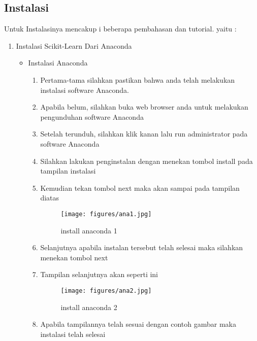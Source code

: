 \subsection{Instalasi}
Untuk Instalasinya mencakup i beberapa pembahasan dan tutorial. yaitu :
\begin{enumerate}
\item Instalasi Scikit-Learn Dari Anaconda
\begin{itemize}
\item Instalasi Anaconda
\begin{enumerate}
\item Pertama-tama silahkan pastikan bahwa anda telah melakukan instalasi software Anaconda.
\item Apabila belum, silahkan buka web browser anda untuk melakukan pengunduhan software Anaconda
\item Setelah terunduh, silahkan klik kanan lalu run administrator pada software Anaconda
\item Silahkan lakukan penginstalan dengan menekan tombol install pada tampilan instalasi
\item Kemudian tekan tombol next maka akan sampai pada tampilan diatas

\par

\begin{figure}[ht]
\centering
\texttt{[image: figures/ana1.jpg]}
\caption{install anaconda 1}
\label{contoh}
\end{figure}

\par
\item Selanjutnya apabila instalan tersebut telah selesai maka silahkan menekan tombol next
\item Tampilan selanjutnya akan seperti ini

\par

\begin{figure}[ht]
\centering
\texttt{[image: figures/ana2.jpg]}
\caption{install anaconda 2}
\label{contoh}
\end{figure}

\par

\item Apabila tampilannya telah sesuai dengan contoh gambar maka instalasi telah selesai
\end{enumerate}
\end{itemize}


\end{enumerate}
